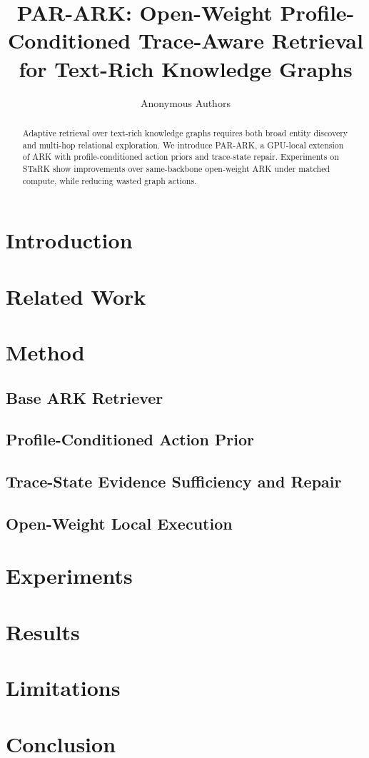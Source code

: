 \documentclass{article}
\title{PAR-ARK: Open-Weight Profile-Conditioned Trace-Aware Retrieval for Text-Rich Knowledge Graphs}
\author{Anonymous Authors}
\begin{document}
\maketitle
\begin{abstract}
Adaptive retrieval over text-rich knowledge graphs requires both broad entity discovery and multi-hop relational exploration. We introduce PAR-ARK, a GPU-local extension of ARK with profile-conditioned action priors and trace-state repair. Experiments on STaRK show improvements over same-backbone open-weight ARK under matched compute, while reducing wasted graph actions.
\end{abstract}
\section{Introduction}
\section{Related Work}
\section{Method}
\subsection{Base ARK Retriever}
\subsection{Profile-Conditioned Action Prior}
\subsection{Trace-State Evidence Sufficiency and Repair}
\subsection{Open-Weight Local Execution}
\section{Experiments}
\section{Results}
\section{Limitations}
\section{Conclusion}
\end{document}
